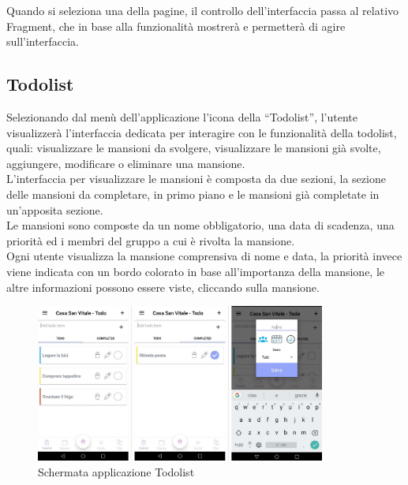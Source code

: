 Quando si seleziona una della pagine, il controllo dell'interfaccia passa al relativo Fragment, che in base alla funzionalità mostrerà e permetterà di agire sull'interfaccia.

\newpage
\subsection{Todolist}

Selezionando dal menù dell'applicazione l'icona della ``Todolist'', l'utente visualizzerà l'interfaccia dedicata per interagire con le funzionalità della todolist, quali: visualizzare le mansioni da svolgere, visualizzare le mansioni già svolte, aggiungere, modificare o eliminare una mansione.\\
L'interfaccia per visualizzare le mansioni è composta da due sezioni, la sezione delle mansioni da completare, in primo piano e le mansioni già completate in un'apposita sezione.\\
Le mansioni sono composte da un nome obbligatorio, una data di scadenza, una priorità ed i membri del gruppo a cui è rivolta la mansione.\\
Ogni utente visualizza la mansione comprensiva di nome e data, la priorità invece viene indicata con un bordo colorato in base all'importanza della mansione, le altre informazioni possono essere viste, cliccando sulla mansione.\\

\begin{figure}[!hb]
  \centering
  \includegraphics[width=0.85\textwidth]{immagini/app_todolist.png}
  \caption{Schermata applicazione Todolist}\label{fig:Schermata applicazione Todolist}
\end{figure}



